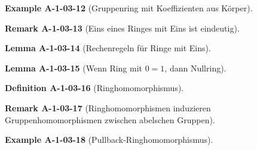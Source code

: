 \documentclass[10pt, letterpaper]{article}
\newcommand{\CustomHeading}[3]{%
  \par\medskip\noindent%
  \textbf{#1 #2} \textnormal{(#3)}.\enskip%
}
\newenvironment{DEF}[2]{\CustomHeading{Definition}{#1}{#2}}{}
\newenvironment{LEM}[2]{\CustomHeading{Lemma}{#1}{#2}}{}
\newenvironment{REM}[2]{\CustomHeading{Remark}{#1}{#2}}{}
\newenvironment{EXA}[2]{\CustomHeading{Example}{#1}{#2}}{}
\begin{document}

\begin{EXA}{A-1-03-12}{Gruppenring mit Koeffizienten aus Körper}
\end{EXA}


\begin{REM}{A-1-03-13}{Eins eines Ringes mit Eins ist eindeutig}
\end{REM}


\begin{LEM}{A-1-03-14}{Rechenregeln für Ringe mit Eins}
\end{LEM}


\begin{LEM}{A-1-03-15}{Wenn Ring mit $0=1$, dann Nullring}
\end{LEM}


\begin{DEF}{A-1-03-16}{Ringhomomorphismus}
\end{DEF}


\begin{REM}{A-1-03-17}{Ringhomomorphismen induzieren Gruppenhomomorphismen zwischen abelschen Gruppen}
\end{REM}


\begin{EXA}{A-1-03-18}{Pullback-Ringhomomorphismus}
\end{EXA}

\end{document}
